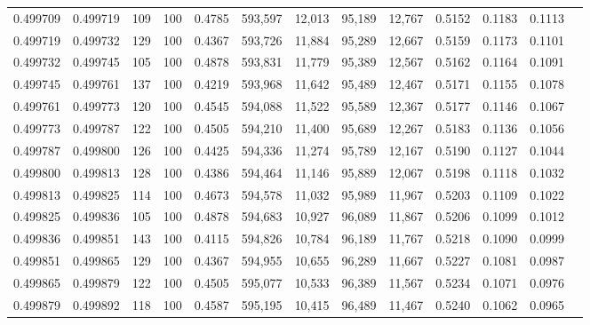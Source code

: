 \begin{tabular}{rrrrrrrrrrrrr}
0.499709 & 0.499719 &   109 & 100 &                                     0.4785 & 593,597 &  12,013 &  95,189 &  12,767 & 0.5152 & 0.1183 & 0.1113 \\
0.499719 & 0.499732 &   129 & 100 &                                     0.4367 & 593,726 &  11,884 &  95,289 &  12,667 & 0.5159 & 0.1173 & 0.1101 \\
0.499732 & 0.499745 &   105 & 100 &                                     0.4878 & 593,831 &  11,779 &  95,389 &  12,567 & 0.5162 & 0.1164 & 0.1091 \\
0.499745 & 0.499761 &   137 & 100 &                                     0.4219 & 593,968 &  11,642 &  95,489 &  12,467 & 0.5171 & 0.1155 & 0.1078 \\
0.499761 & 0.499773 &   120 & 100 &                                     0.4545 & 594,088 &  11,522 &  95,589 &  12,367 & 0.5177 & 0.1146 & 0.1067 \\
0.499773 & 0.499787 &   122 & 100 &                                     0.4505 & 594,210 &  11,400 &  95,689 &  12,267 & 0.5183 & 0.1136 & 0.1056 \\
0.499787 & 0.499800 &   126 & 100 &                                     0.4425 & 594,336 &  11,274 &  95,789 &  12,167 & 0.5190 & 0.1127 & 0.1044 \\
0.499800 & 0.499813 &   128 & 100 &                                     0.4386 & 594,464 &  11,146 &  95,889 &  12,067 & 0.5198 & 0.1118 & 0.1032 \\
0.499813 & 0.499825 &   114 & 100 &                                     0.4673 & 594,578 &  11,032 &  95,989 &  11,967 & 0.5203 & 0.1109 & 0.1022 \\
0.499825 & 0.499836 &   105 & 100 &                                     0.4878 & 594,683 &  10,927 &  96,089 &  11,867 & 0.5206 & 0.1099 & 0.1012 \\
0.499836 & 0.499851 &   143 & 100 &                                     0.4115 & 594,826 &  10,784 &  96,189 &  11,767 & 0.5218 & 0.1090 & 0.0999 \\
0.499851 & 0.499865 &   129 & 100 &                                     0.4367 & 594,955 &  10,655 &  96,289 &  11,667 & 0.5227 & 0.1081 & 0.0987 \\
0.499865 & 0.499879 &   122 & 100 &                                     0.4505 & 595,077 &  10,533 &  96,389 &  11,567 & 0.5234 & 0.1071 & 0.0976 \\
0.499879 & 0.499892 &   118 & 100 &                                     0.4587 & 595,195 &  10,415 &  96,489 &  11,467 & 0.5240 & 0.1062 & 0.0965 \\

\end{tabular}
